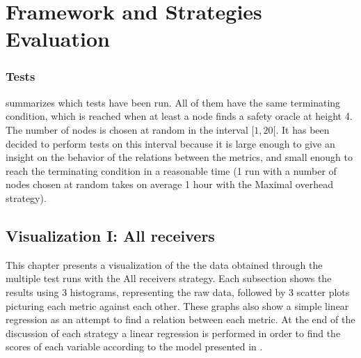 \chapter{Framework and Strategies Evaluation}
\label{chap:strategies}

\subsection{Tests}
 summarizes which tests have been run.
All of them have the same terminating condition, which is reached when at least a
node finds a safety oracle at height 4. The number of nodes is chosen at random
in the interval \([1, 20[\). It has been decided to perform tests on this
interval because it is large enough to give an insight on the behavior of the
relations between the metrics, and small enough to reach the terminating condition in
a reasonable time (1 run with a number of nodes chosen at random takes on average 1 hour
with the Maximal overhead strategy).


\begin{table}[H]
\end{table}


\section{Visualization I: All receivers}
This chapter presents a visualization of the the data obtained through the multiple
test runs with the All receivers strategy.  Each subsection shows the results
using 3 histograms, representing the raw data, followed by 3 scatter plots
picturing each metric against each other. These graphs also show a simple linear
regression as an attempt to find a relation between each metric. At the end of
the discussion of each strategy a linear regression is performed in order to
find the scores of each variable according to the model presented in
.


